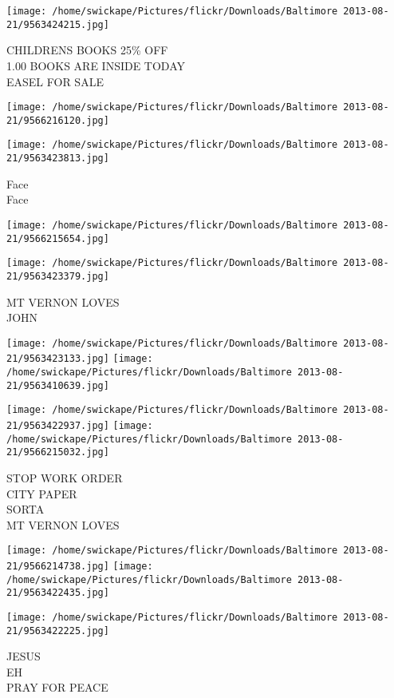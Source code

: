 \documentclass[10pt,letterpaper]{article}
\begin{document}
\texttt{[image: /home/swickape/Pictures/flickr/Downloads/Baltimore 2013-08-21/9563424215.jpg]}

CHILDRENS BOOKS 25\% OFF\\
1.00 BOOKS ARE INSIDE TODAY\\
EASEL FOR SALE
\pagebreak

\texttt{[image: /home/swickape/Pictures/flickr/Downloads/Baltimore 2013-08-21/9566216120.jpg]}

\vspace{0.25in}
\texttt{[image: /home/swickape/Pictures/flickr/Downloads/Baltimore 2013-08-21/9563423813.jpg]}

Face\\
Face
\pagebreak

\texttt{[image: /home/swickape/Pictures/flickr/Downloads/Baltimore 2013-08-21/9566215654.jpg]}

\vspace{0.25in}
\texttt{[image: /home/swickape/Pictures/flickr/Downloads/Baltimore 2013-08-21/9563423379.jpg]}

MT VERNON LOVES\\
JOHN
\pagebreak

\texttt{[image: /home/swickape/Pictures/flickr/Downloads/Baltimore 2013-08-21/9563423133.jpg]}
\texttt{[image: /home/swickape/Pictures/flickr/Downloads/Baltimore 2013-08-21/9563410639.jpg]}

\texttt{[image: /home/swickape/Pictures/flickr/Downloads/Baltimore 2013-08-21/9563422937.jpg]}
\texttt{[image: /home/swickape/Pictures/flickr/Downloads/Baltimore 2013-08-21/9566215032.jpg]}

STOP WORK ORDER\\
CITY PAPER\\
SORTA\\
MT VERNON LOVES
\pagebreak

\texttt{[image: /home/swickape/Pictures/flickr/Downloads/Baltimore 2013-08-21/9566214738.jpg]}
\texttt{[image: /home/swickape/Pictures/flickr/Downloads/Baltimore 2013-08-21/9563422435.jpg]}

\vspace{0.25in}
\texttt{[image: /home/swickape/Pictures/flickr/Downloads/Baltimore 2013-08-21/9563422225.jpg]}

JESUS\\
EH\\
PRAY FOR PEACE
\pagebreak
\end{document}
